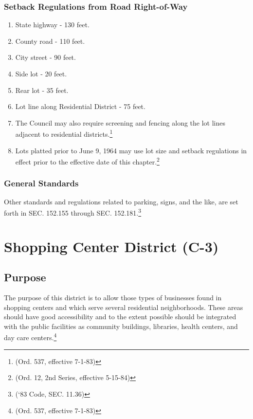 \subsubsection{Setback Regulations from Road Right-of-Way}
\begin{enumerate}[{\indent}a)]
    \item State highway - 130 feet.
    \item County road - 110 feet.
    \item City street - 90 feet.
    \item Side lot - 20 feet.
    \item Rear lot - 35 feet.
    \item Lot line along Residential District - 75 feet.
    \item The Council may also require screening and fencing along the lot lines adjacent to residential districts.\footnote{(Ord. 537, effective 7-1-83)}
    \item Lots platted prior to June 9, 1964 may use lot size and setback regulations in effect prior to the effective date of this chapter.\footnote{(Ord. 12, 2nd Series, effective 5-15-84)}
\end{enumerate}
\subsubsection{General Standards}
Other standards and regulations related to parking, signs, and the like, are set forth in SEC. 152.155 through SEC. 152.181.\footnote{(‘83 Code, SEC. 11.36)}
\section{Shopping Center District (C-3)}
\subsection{Purpose}
The purpose of this district is to allow those types of businesses found in shopping centers and which serve several residential neighborhoods. These areas should have good accessibility and to the extent possible should be integrated with the public facilities as community buildings, libraries, health centers, and day care centers.\footnote{(Ord. 537, effective 7-1-83)}

